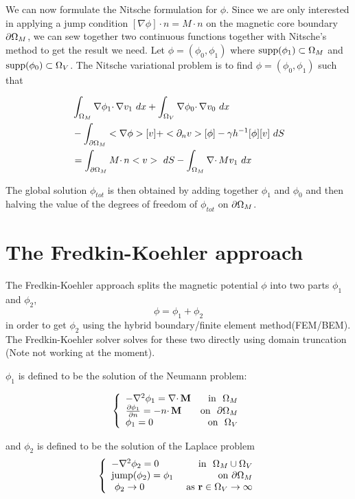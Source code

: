 \documentclass[12pt,a4paper,notitlepage]{article}
\begin{document}
We can now formulate the Nitsche formulation for $\phi$. Since we are only interested in applying a jump condition
$ [\nabla \phi]  \cdotp n =  M \cdotp n $ on the magnetic core boundary $\partial \Omega_M$, we can sew together two continuous functions
together with Nitsche's method to get the result we need. Let $\phi = (\phi_0,\phi_1)$ where
$\operatorname{supp}(\phi_1) \subset \Omega_M$ and $\operatorname{supp}(\phi_0) \subset \Omega_V$. The Nitsche variational problem is to find  $\phi = (\phi_0,\phi_1)$ such that

\begin{align*}
&\int_{\Omega_M} \nabla \phi_1 \cdotp \nabla v_1 \ dx + \int_{\Omega_V} \nabla \phi_0 \cdotp \nabla v_0 \ dx \\
&- \int_{\partial \Omega_M} <\nabla \phi> [v]  + <\partial_n v> [\phi] - \gamma h^{-1} [\phi][v] \ dS \\
&= \int_{\partial \Omega_M} M  \cdotp n <v> \ dS - \int_{\Omega_M} \nabla \cdotp M v_1 \ dx
\end{align*}

The global solution $\phi_{tot}$ is then obtained by adding together $\phi_1$ and $\phi_0$ and then halving the value
of the degrees of freedom of $\phi_{tot}$ on $\partial \Omega_M$.


\section{The Fredkin-Koehler approach} 
The Fredkin-Koehler approach splits the magnetic potential $\phi$ into two parts $\phi_1$ and $\phi_2$, 
\[ \phi = \phi_1 + \phi_2 \]
\noindent in order to get $\phi_2$ using the hybrid boundary/finite element method(FEM/BEM).
The Fredkin-Koehler solver solves for these two directly using domain truncation (Note not working at the moment).

\noindent $\phi_1$ is defined to be the solution of the Neumann problem:

\[ 
\left\{
\begin{array}{lr}
- \nabla^2 \phi_1 = \nabla \cdotp \mathbf{M}  & \mbox{in } \ \Omega_M \\
 \frac{\partial \phi_1}{\partial n}  = -n \cdotp \mathbf{M} & \mbox{on } \  \partial \Omega_M \\
 \phi_1 = 0 & \mbox{on} \ \ \Omega_V
\end{array}
\right. 
\]


\noindent and $\phi_2$ is defined to be the solution of the Laplace problem
\[ 
\left\{
\begin{array}{lr}
- \nabla^2 \phi_2 = 0 & \mbox{in } \ \Omega_M \cup \Omega_V \\
\mbox{jump}(\phi_2) = \phi_1 & \mbox{on} \ \partial \Omega_M \\
\ \phi_2 \rightarrow 0 & \ \mbox{as} \ \mathbf{r} \in \Omega_V \rightarrow \infty
\end{array}
\right. 
\]
\end{document}
